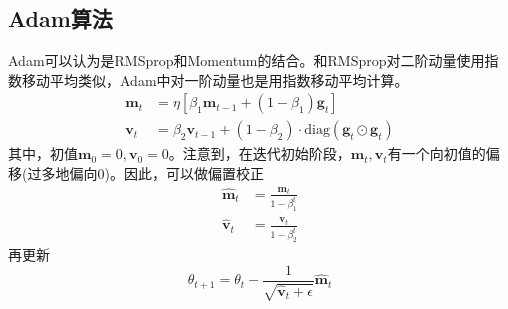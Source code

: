 \subsection{Adam算法}
Adam可以认为是RMSprop和Momentum的结合。和RMSprop对二阶动量使用指数移动平均类似，Adam中对一阶动量也是用指数移动平均计算。
\begin{equation}
	\begin{aligned}
		\boldsymbol{m}_t&=\eta [\beta_1 \boldsymbol{m}_{t-1} + (1-\beta_1)  \boldsymbol{g}_t]\\
		\boldsymbol{v}_t &= \beta_2 \boldsymbol{v}_{t-1} + (1-\beta_2)\cdot \mathrm{diag}(\boldsymbol{g}_t \odot \boldsymbol{g}_t) 
	\end{aligned}
\end{equation}
其中，初值$\boldsymbol{m}_0=0,\boldsymbol{v}_0=0$。注意到，在迭代初始阶段，$\boldsymbol{m}_t,\boldsymbol{v}_t$有一个向初值的偏移(过多地偏向0)。因此，可以做偏置校正
\begin{equation}
\begin{aligned}
	\hat{\boldsymbol{m}}_t&=\frac{\boldsymbol{m}_t}{1-\beta_1^t}\\
	\hat{\boldsymbol{v}}_t &=  \frac{\boldsymbol{v}_t}{1-\beta_2^t}
\end{aligned}
\end{equation}
再更新
\begin{equation}
	\theta_{t+1} = \theta_{t} - \frac{1}{\sqrt{\hat{\boldsymbol{v}}_t + \epsilon}}\hat{\boldsymbol{m}}_t
\end{equation}